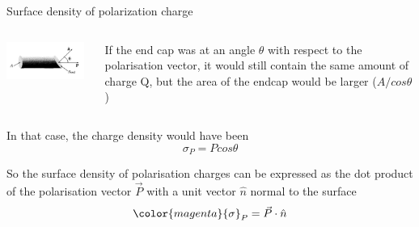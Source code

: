 %
%
%

\begin{frame}{Surface density of polarization charge}

\begin{columns}
  \begin{column}{0.35\textwidth}
   \begin{center}
     \includegraphics[width=0.95\textwidth]{./images/schematics/polarisation_surface_charge_density_2.png}\\
   \end{center}
  \end{column}
  \begin{column}{0.65\textwidth}
    If the end cap was at an angle $\theta$ with respect to the polarisation vector,
    it would still contain the same amount of charge Q, but the area of the endcap would be larger ($A / cos\theta$)
  \end{column}
\end{columns}

\vspace{0.2cm}

In that case, the charge density would have been
\begin{equation*}
  {\sigma}_P = P cos\theta
\end{equation*}

So the surface density of polarisation charges can be expressed
as the dot product of the polarisation vector $\vec{P}$ with a unit vector $\hat{n}$ normal to the surface
\begin{equation*}
 {\color{magenta} {\sigma}_P = \vec{P} \cdot \hat{n}}
\end{equation*}

\end{frame}

%
%
%

